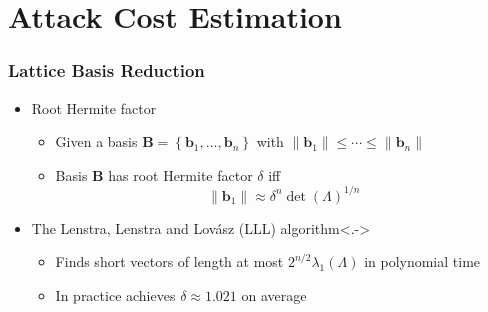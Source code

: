 \documentclass[t, aspectratio=169]{beamer}
\begin{document}
\section{Attack Cost Estimation}
\begin{frame}
    \frametitle{Lattice Basis Reduction}
    \begin{itemize}[<+->]
        \item Root Hermite factor
              \begin{itemize}[<+->]
                  \item Given a basis $\mathbf{B} = \left\{\mathbf{b}_1, \ldots, \mathbf{b}_n\right\}$ with $\|\mathbf{b}_1\| \leq \cdots  \leq \|\mathbf{b}_n\|$
                  \item Basis $\mathbf{B}$ has root Hermite factor $\delta$ iff %
                        \begin{equation*} \label{eq:hermite}
                            \| \mathbf{b}_1 \| \approx \delta^n \det(\Lambda)^{1/n}
                        \end{equation*}
              \end{itemize}
        \item The Lenstra, Lenstra and Lovász (LLL) algorithm\only<.->{}
              \begin{itemize}[<+->]
                  \item Finds short vectors of length at most $2^{n/2} \lambda_1(\Lambda)$ in polynomial time %
                  \item In practice achieves $\delta \approx 1.021$ on average
              \end{itemize}
    \end{itemize}
\end{frame}
\end{document}
